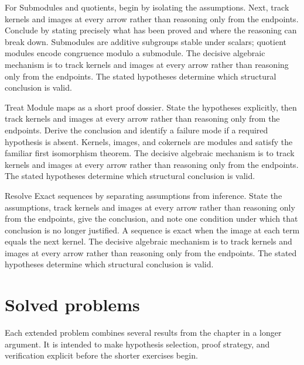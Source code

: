 \begin{example}\label{ex:v09-worked-02}
For Submodules and quotients, begin by isolating the assumptions. Next, track kernels and images at every arrow rather than reasoning only from the endpoints. Conclude by stating precisely what has been proved and where the reasoning can break down. Submodules are additive subgroups stable under scalars; quotient modules encode congruence modulo a submodule. The decisive algebraic mechanism is to track kernels and images at every arrow rather than reasoning only from the endpoints. The stated hypotheses determine which structural conclusion is valid.
\end{example}

\begin{example}\label{ex:v09-worked-03}
Treat Module maps as a short proof dossier. State the hypotheses explicitly, then track kernels and images at every arrow rather than reasoning only from the endpoints. Derive the conclusion and identify a failure mode if a required hypothesis is absent. Kernels, images, and cokernels are modules and satisfy the familiar first isomorphism theorem. The decisive algebraic mechanism is to track kernels and images at every arrow rather than reasoning only from the endpoints. The stated hypotheses determine which structural conclusion is valid.
\end{example}

\begin{example}\label{ex:v09-worked-04}
Resolve Exact sequences by separating assumptions from inference. State the assumptions, track kernels and images at every arrow rather than reasoning only from the endpoints, give the conclusion, and note one condition under which that conclusion is no longer justified. A sequence is exact when the image at each term equals the next kernel. The decisive algebraic mechanism is to track kernels and images at every arrow rather than reasoning only from the endpoints. The stated hypotheses determine which structural conclusion is valid.
\end{example}

\section{Solved problems}
Each extended problem combines several results from the chapter in a longer argument. It is intended to make hypothesis selection, proof strategy, and verification explicit before the shorter exercises begin.

